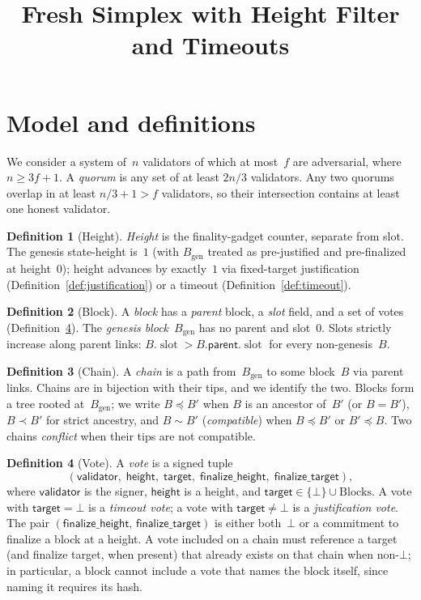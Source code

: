 \ifx\litemode\undefined\documentclass{article}\fi
\title{Fresh Simplex with Height Filter and Timeouts}
\newcommand{\genesis}{\ensuremath{B_{\mathrm{gen}}}}
\newcommand{\slot}[0]{\ensuremath{\operatorname{\mathrm{slot}}}}
\newcommand{\target}{\mathsf{target}}
\newcommand{\height}{\mathsf{height}}
\newcommand{\validator}{\mathsf{validator}}
\newcommand{\parent}{\mathsf{parent}}
\newcommand{\finalizeHeight}{\mathsf{finalize\_height}}
\newcommand{\finalizeTarget}{\mathsf{finalize\_target}}
\theoremstyle{plain}
\theoremstyle{definition}
\newtheorem{definition}{Definition}
\theoremstyle{remark}
\begin{document}
\maketitle
\section{Model and definitions}\label{sec:model}

We consider a system of~$n$ validators of which at most~$f$ are adversarial, where $n \geq 3f + 1$.
A \emph{quorum} is any set of at least $2n/3$ validators.
Any two quorums overlap in at least $n/3 + 1 > f$ validators, so their intersection contains at least one honest validator.

\begin{definition}[Height]\label{def:height}
\emph{Height} is the finality-gadget counter, separate from slot.
The genesis state-height is~$1$ (with $\genesis$ treated as pre-justified and pre-finalized at height~$0$); height advances by exactly~$1$ via fixed-target justification (Definition~\ref{def:justification}) or a timeout (Definition~\ref{def:timeout}).
\end{definition}

\begin{definition}[Block]\label{def:block}
A \emph{block} has a \emph{parent} block, a \emph{slot} field, and a set of votes (Definition~\ref{def:vote}).
The \emph{genesis block}~$\genesis$ has no parent and slot~$0$.
Slots strictly increase along parent links: $B.\slot > B.\parent.\slot$ for every non-genesis~$B$.
\end{definition}

\begin{definition}[Chain]\label{def:chain}
A \emph{chain} is a path from~$\genesis$ to some block~$B$ via parent links.
Chains are in bijection with their tips, and we identify the two.
Blocks form a tree rooted at~$\genesis$; we write $B \preceq B'$ when $B$ is an ancestor of~$B'$ (or $B = B'$), $B \prec B'$ for strict ancestry, and $B \sim B'$ (\emph{compatible}) when $B \preceq B'$ or $B' \preceq B$.
Two chains \emph{conflict} when their tips are not compatible.
\end{definition}

\begin{definition}[Vote]\label{def:vote}
A \emph{vote} is a signed tuple
\[
  (\validator,\; \height,\; \target,\; \finalizeHeight,\; \finalizeTarget),
\]
where $\validator$ is the signer, $\height$ is a height, and $\target \in \{\bot\} \cup \mathrm{Blocks}$.
A vote with $\target = \bot$ is a \emph{timeout vote}; a vote with $\target \neq \bot$ is a \emph{justification vote}.
The pair $(\finalizeHeight,\, \finalizeTarget)$ is either both~$\bot$ or a commitment to finalize a block at a height.
A vote included on a chain must reference a target (and finalize target, when present) that already exists on that chain when non-$\bot$; in particular, a block cannot include a vote that names the block itself, since naming it requires its hash.
\end{definition}
\end{document}
